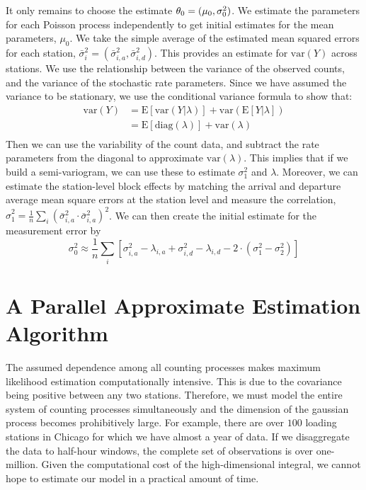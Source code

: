 \documentclass{acm_proc_article-sp}
\begin{document}
It only remains to choose the estimate $\theta_0 = (\mu_0 , {\bf \sigma}_0^2)$.  We estimate the parameters for each Poisson process independently to get initial estimates for the mean parameters, $\mu_0$.  We take the simple average of the estimated mean squared errors for each station, $\bar{\sigma}_i^2 = \left( \bar{\sigma}_{i,a}^2 ,\bar{\sigma}_{i,d}^2 \right)$.  This provides an estimate for $\text{var} (Y)$ across stations.   We use the relationship between the variance of the observed counts, and the variance of the stochastic rate parameters.  Since we have assumed the variance to be stationary, we use the conditional variance formula to show that:
\begin{align*} 
\text{var} \left( Y \right) &= \text{E} \left[ \text{var} \left( Y | \lambda \right) \right] + \text{var} \left( \text{E} \left[ Y | \lambda \right] \right) \\
&= \text{E} \left[ \text{diag} (\lambda) \right] + \text{var} \left( \lambda \right) \\
\end{align*}
\noindent Then we can use the variability of the count data, and subtract the rate parameters from the diagonal to approximate $\text{var}(\lambda)$.  This implies that if we build a semi-variogram, we can use these to estimate $\sigma_1^2$ and $\lambda$.  Moreover, we can estimate the station-level block effects by matching the arrival and departure average mean square errors at the station level and measure the correlation, $\hat{\sigma}_1^2 = \frac{1}{n} \sum_i ( \bar{\sigma}_{i,a}^2  \cdot \bar{\sigma}_{i,a}^2 )^2$.  We can then create the initial estimate for the measurement error by
\begin{equation*}
\sigma_0^2 \approx \frac{1}{n}\sum_i \left[ \sigma^2_{i,a} - \lambda_{i,a} + \sigma^2_{i,d} - \lambda_{i,d}  - 2\cdot \left(\sigma_1^2 - \sigma_2^2 \right) \right]
\end{equation*}

\section{A Parallel Approximate Estimation Algorithm} \label{parallel_estimation}

The assumed dependence among all counting processes makes maximum likelihood estimation computationally intensive.  This is due to the covariance being positive between any two stations.  Therefore, we must model the entire system of counting processes simultaneously and the dimension of the gaussian process becomes prohibitively large.  For example, there are over $100$ loading stations in Chicago for which we have almost a year of data.  If we disaggregate the data to half-hour windows, the complete set of observations is over one-million.  Given the computational cost of the high-dimensional integral, we cannot hope to estimate our model in a practical amount of time.
\end{document}
